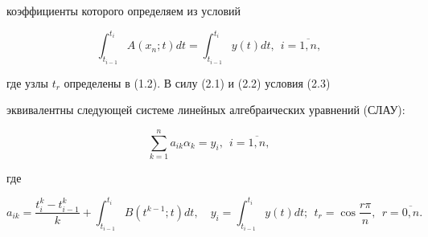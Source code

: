 коэффициенты которого определяем из условий


\begin{equation}


\int_{t_{i-1}}^{t_i}A(x_n;t)dt=\int_{t_{i-1}}^{t_i}y(t)dt,\ \


i=\overline{1,n},


\end{equation}


где узлы $t_r$ определены в (1.2). В силу (2.1) и (2.2) условия (2.3)


эквивалентны следующей системе линейных алгебраических уравнений (СЛАУ):


\begin{equation}


\sum_{k=1}^{n}a_{ik}\alpha_k=y_i,\ \ i=\overline{1,n},


\end{equation}


где


\begin{equation}


a_{ik}=\frac{t_i^k-t_{i-1}^k}{k}+


\int_{t_{i-1}}^{t_i}B(t^{k-1};t)dt,\quad y_i = \int_{t_{i-1}}^{t_i}


y(t)dt;\ \ t_r=\cos\frac{r\pi}{n},\ \ r=\overline{0,n}.


\end{equation}





